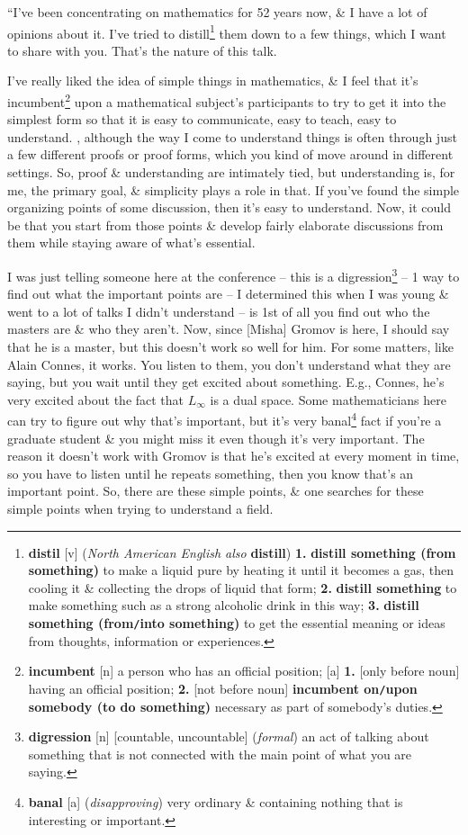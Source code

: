 \documentclass[oneside]{book}
\numberwithin{equation}{section}
\begin{document}
``I've been concentrating on mathematics for 52 years now, \& I have a lot of opinions about it. I've tried to distill\footnote{\textbf{distil} [v] (\textit{North American English also} \textbf{distill}) \textbf{1.} \textbf{distill something (from something)} to make a liquid pure by heating it until it becomes a gas, then cooling it \& collecting the drops of liquid that form; \textbf{2.} \textbf{distill something} to make something such as a strong alcoholic drink in this way; \textbf{3.} \textbf{distill something (from\texttt{/}into something)} to get the essential meaning or ideas from thoughts, information or experiences.} them down to a few things, which I want to share with you. That's the nature of this talk.

I've really liked the idea of simple things in mathematics, \& I feel that it's incumbent\footnote{\textbf{incumbent} [n] a person who has an official position; [a] \textbf{1.} [only before noun] having an official position; \textbf{2.} [not before noun] \textbf{incumbent on\texttt{/}upon somebody (to do something)} necessary as part of somebody's duties.} upon a mathematical subject's participants to try to get it into the simplest form so that it is easy to communicate, easy to teach, easy to understand. , although the way I come to understand things is often through just a few different proofs or proof forms, which you kind of move around in different settings. So, proof \& understanding are intimately tied, but understanding is, for me, the primary goal, \& simplicity plays a role in that. If you've found the simple organizing points of some discussion, then it's easy to understand. Now, it could be that you start from those points \& develop fairly elaborate discussions from them while staying aware of what's essential.

I was just telling someone here at the conference -- this is a digression\footnote{\textbf{digression} [n] [countable, uncountable] (\textit{formal}) an act of talking about something that is not connected with the main point of what you are saying.} -- 1 way to find out what the important points are -- I determined this when I was young \& went to a lot of talks I didn't understand -- is 1st of all you find out who the masters are \& who they aren't. Now, since [Misha] Gromov is here, I should say that he is a master, but this doesn't work so well for him. For some matters, like Alain Connes, it works. You listen to them, you don't understand what they are saying, but you wait until they get excited about something. E.g., Connes, he's very excited about the fact that $L_\infty$ is a dual space. Some mathematicians here can try to figure out why that's important, but it's very banal\footnote{\textbf{banal} [a] (\textit{disapproving}) very ordinary \& containing nothing that is interesting or important.} fact if you're a graduate student \& you might miss it even though it's very important. The reason it doesn't work with Gromov is that he's excited at every moment in time, so you have to listen until he repeats something, then you know that's an important point. So, there are these simple points, \& one searches for these simple points when trying to understand a field.
\end{document}
